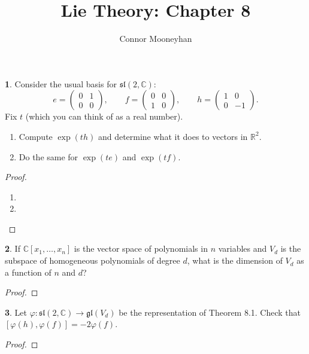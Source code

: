 \documentclass[12pt]{article}
\title{Lie Theory: Chapter 8}
\author{Connor Mooneyhan}
\date{}
\newcommand{\gl}{\mathfrak{gl}}
\renewcommand{\sl}{\mathfrak{sl}}
\theoremstyle{definition}
\newtheorem{ex}{}
\begin{document}
\maketitle

\begin{ex}
	Consider the usual basis for $\sl(2, \mathbb{C})$: \begin{equation*}
		e = \begin{pmatrix} 0 & 1 \\ 0 & 0 \end{pmatrix}, \hspace{2em} f = \begin{pmatrix} 0 & 0 \\ 1 & 0 \end{pmatrix}, \hspace{2em} h = \begin{pmatrix} 1 & 0 \\ 0 & -1 \end{pmatrix}.
	\end{equation*}
	Fix $t$ (which you can think of as a real number).
	\begin{enumerate}[label=(\alph*)]
		\item Compute $\exp(th)$ and determine what it does to vectors in $\mathbb{R}^2$.
		\item Do the same for $\exp(te)$ and $\exp(tf)$.
	\end{enumerate}
\end{ex}
\begin{proof}\
	\begin{enumerate}[label=(\alph*)]
		\item
		\item
	\end{enumerate}
\end{proof}

\begin{ex}
	If $\mathbb{C}[x_1, \dots, x_n]$ is the vector space of polynomials in $n$ variables and $V_d$ is the subspace of homogeneous polynomials of degree $d$, what is the dimension of $V_d$ as a function of $n$ and $d$?
\end{ex}
\begin{proof}

\end{proof}

\begin{ex}
	Let $\varphi : \sl(2, \mathbb{C}) \to \gl(V_d)$ be the representation of Theorem 8.1.
	Check that $[\varphi(h), \varphi(f)] = -2\varphi(f)$.
\end{ex}
\begin{proof}

\end{proof}
\end{document}
